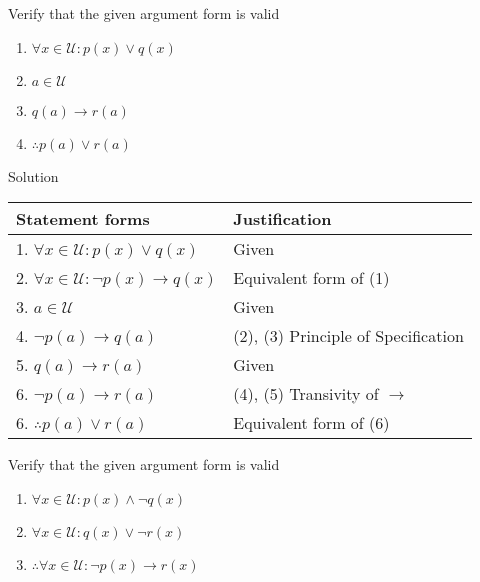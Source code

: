 \begin{longfbox}
    \begin{bt} \label{pro:practice2.37}
        Verify that the given argument form is valid
        \begin{enumerate}
            \item[] $\forall x \in \mathcal U: p(x) \lor q(x)$
            \item[] $a \in \mathcal U$
            \item[] $q(a) \rightarrow r(a)$
            \item[] $\therefore p(a) \lor r(a)$
        \end{enumerate}
    \end{bt}
\end{longfbox}

Solution
\begin{table}[hbt!]
    \centering
    \begin{tabular}{|l | l|}
    \hline
    Statement forms & Justification\\ [0.5ex]
    \hline
        1. $\forall x \in \mathcal U: p(x) \lor q(x)$ & Given \\
        2. $\forall x \in \mathcal U: \neg p(x) \rightarrow q(x)$ & Equivalent form of (1) \\
        3. $a \in \mathcal U$ & Given \\
        4. $\neg p(a) \rightarrow q(a)$ & (2), (3) Principle of Specification \\
        5. $q(a) \rightarrow r(a)$ & Given \\
        6. $\neg p(a) \rightarrow r(a)$ & (4), (5) Transivity of $\rightarrow$ \\
        6. $\therefore p(a) \lor r(a)$ & Equivalent form of (6) \\
    \hline
    \end{tabular}
\end{table}

\newpage
\begin{longfbox}
    \begin{bt} \label{pro:practice2.38}
        Verify that the given argument form is valid
        \begin{enumerate}
            \item[] $\forall x \in \mathcal U: p(x) \land \neg q(x)$
            \item[] $\forall x \in \mathcal U: q(x) \lor \neg r(x)$
            \item[] $\therefore \forall x \in \mathcal U: \neg p(x) \rightarrow r(x)$
        \end{enumerate}
    \end{bt}
\end{longfbox}

